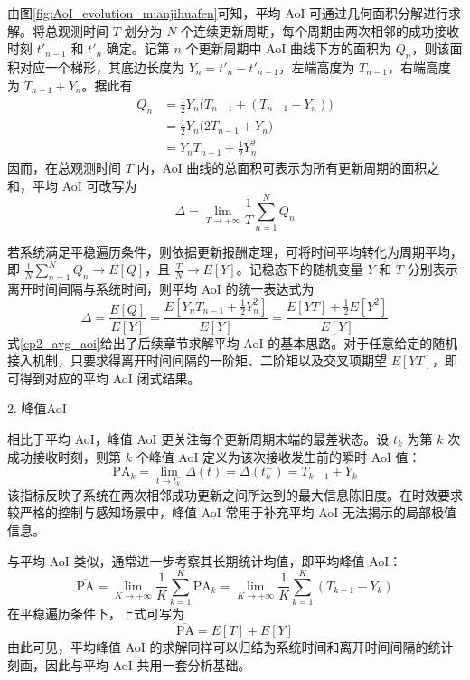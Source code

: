 由图\ref{fig:AoI_evolution_mianjihuafen}可知，平均 AoI 可通过几何面积分解进行求解。将总观测时间 $T$ 划分为 $N$ 个连续更新周期，每个周期由两次相邻的成功接收时刻 $t'_{n-1}$ 和 $t'_n$ 确定。记第 $n$ 个更新周期中 AoI 曲线下方的面积为 $Q_n$，则该面积对应一个梯形，其底边长度为 $Y_n=t'_n-t'_{n-1}$，左端高度为 $T_{n-1}$，右端高度为 $T_{n-1}+Y_n$。据此有
\begin{equation}
\begin{aligned}
Q_n &= \frac{1}{2} Y_n \big(T_{n-1} + (T_{n-1} + Y_n)\big) \\
&= \frac{1}{2} Y_n \big(2T_{n-1} + Y_n\big) \\
&= Y_n T_{n-1} + \frac{1}{2} Y_n^2
\end{aligned}
\end{equation}
因而，在总观测时间 $T$ 内，AoI 曲线的总面积可表示为所有更新周期的面积之和，平均 AoI 可改写为
\begin{equation}\label{aoitoarea}
    \Delta =  \lim_{T \to +\infty} \frac{1}{T} \sum_{n=1}^{N} Q_n
\end{equation}

若系统满足平稳遍历条件，则依据更新报酬定理，可将时间平均转化为周期平均，即 $\frac{1}{N}\sum_{n=1}^{N}Q_n \to E[Q]$，且 $\frac{T}{N} \to E[Y]$。记稳态下的随机变量 $Y$ 和 $T$ 分别表示离开时间间隔与系统时间，则平均 AoI 的统一表达式为
\begin{equation}\label{cp2_avg_aoi}
    \Delta = \frac{E[Q]}{E[Y]} = \frac{E\left[Y_n T_{n-1} + \frac{1}{2} Y_n^2\right]}{E[Y]}=\frac{E[Y T] + \frac{1}{2} E[Y^2]}{E[Y]}
\end{equation}
式\eqref{cp2_avg_aoi}给出了后续章节求解平均 AoI 的基本思路。对于任意给定的随机接入机制，只要求得离开时间间隔的一阶矩、二阶矩以及交叉项期望 $E[YT]$，即可得到对应的平均 AoI 闭式结果。

2. 峰值AoI

相比于平均 AoI，峰值 AoI 更关注每个更新周期末端的最差状态。设 $t_k$ 为第 $k$ 次成功接收时刻，则第 $k$ 个峰值 AoI 定义为该次接收发生前的瞬时 AoI 值：
\begin{equation}
    \text{PA}_k = \lim_{t \to t_k^-} \Delta(t) = \Delta(t_k^-) = T_{k-1} + Y_k
\end{equation}
该指标反映了系统在两次相邻成功更新之间所达到的最大信息陈旧度。在时效要求较严格的控制与感知场景中，峰值 AoI 常用于补充平均 AoI 无法揭示的局部极值信息。

与平均 AoI 类似，通常进一步考察其长期统计均值，即平均峰值 AoI：
\begin{equation}\label{avg_peak_aoi}
    \overline{\text{PA}} = \lim_{K \to +\infty} \frac{1}{K} \sum_{k=1}^{K} \text{PA}_k =  \lim_{K \to +\infty} \frac{1}{K} \sum_{k=1}^{K} (T_{k-1} + Y_k)
\end{equation}
在平稳遍历条件下，上式可写为
\begin{equation}
    \overline{\text{PA}} =  E[T] + E[Y]
\end{equation}
由此可见，平均峰值 AoI 的求解同样可以归结为系统时间和离开时间间隔的统计刻画，因此与平均 AoI 共用一套分析基础。
    
